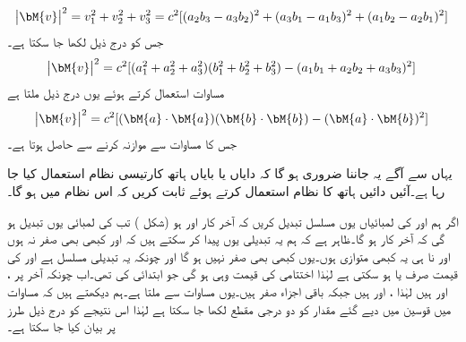 \begin{align*}
\abs{\bM{v}}^2=v_1^2+v_2^2+v_3^2=c^2[(a_2b_3-a_3b_2)^2+(a_3b_1-a_1b_3)^2+(a_1b_2-a_2b_1)^2]
\end{align*}
جس کو درج ذیل لکھا جا سکتا ہے۔
\begin{align*}
\abs{\bM{v}}^2=c^2[(a_1^2+a_2^2+a_3^2)(b_1^2+b_2^2+b_3^2)-(a_1b_1+a_2b_2+a_3b_3)^2]
\end{align*}
مساوات  استعمال کرتے ہوئے یوں درج ذیل ملتا ہے
\begin{align*}
\abs{\bM{v}}^2=c^2[(\bM{a}\cdot\bM{a})(\bM{b}\cdot\bM{b})-(\bM{a}\cdot\bM{b})^2]
\end{align*}
جس کا مساوات  سے موازنہ کرنے سے  حاصل ہوتا ہے۔

یہاں سے آگے یہ جاننا ضروری ہو گا کہ دایاں یا بایاں ہاتھ کارتیسی نظام استعمال کیا جا رہا ہے۔آئیں دائیں ہاتھ کا نظام استعمال کرتے ہوئے ثابت کریں کہ اس نظام میں  ہو گا۔

اگر ہم  اور  کی لمبائیاں یوں مسلسل تبدیل کریں کہ آخر کار  اور  ہو (شکل ) تب  کی لمبائی یوں تبدیل ہو گی کہ آخر کار  ہو گا۔ظاہر ہے کہ ہم یہ تبدیلی یوں پیدا کر سکتے ہیں کہ  اور  کبھی بھی صفر نہ ہوں اور نا ہی یہ کبھی متوازی ہوں۔یوں  کبھی بھی صفر نہیں ہو گا اور چونکہ یہ تبدیلی مسلسل ہے اور  کی قیمت صرف  یا  ہو سکتی ہے لہٰذا اختتامی  کی قیمت وہی ہو گی جو ابتدائی  کی تھی۔اب چونکہ آخر پر ،  اور  ہیں لہٰذا ،  اور  ہیں جبکہ باقی اجزاء صفر ہیں۔یوں مساوات  سے  ملتا ہے۔ہم دیکھتے ہیں کہ مساوات  میں قوسین میں دیے گئے مقدار کو دو درجی مقطع لکھا جا سکتا ہے لہٰذا اس نتیجے کو درج ذیل طرز پر بیان کیا جا سکتا ہے۔

